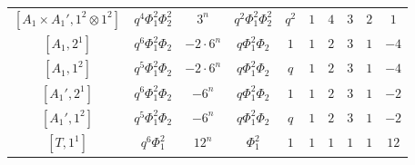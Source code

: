 \documentclass[12pt]{amsart}
\theoremstyle{plain}
\theoremstyle{definition}
\theoremstyle{remark}
\begin{document}
\begin{landscape}
\begin{figure}[h]
\begin{tabular}{|c|cc|ccccccc|}
$[{A_1\times A_1'},1^2\otimes1^2]$ & $q^4\Phi_1^2\Phi_2^2$ & $3^n$ & $q^2\Phi_1^2\Phi_2^2$ & $q^2$ & $1$ & $4$ & $3$ & $2$ & $1$ \\
$[{A_1},2^1]$ & $q^6\Phi_1^2\Phi_2$ & $-2\cdot 6^n$ & $q\Phi_1^2\Phi_2$ & $1$ & $1$ & $2$ & $3$ & $1$ & $-4$ \\
$[{A_1},1^2]$ & $q^5\Phi_1^2\Phi_2$ & $-2\cdot 6^n$ & $q\Phi_1^2\Phi_2$ & $q$ & $1$ & $2$ & $3$ & $1$ & $-4$ \\
$[{A_1'},2^1]$ & $q^6\Phi_1^2\Phi_2$ & $-6^n$ & $q\Phi_1^2\Phi_2$ & $1$ & $1$ & $2$ & $3$ & $1$ & $-2$ \\
$[{A_1'},1^2]$ & $q^5\Phi_1^2\Phi_2$ & $-6^n$ & $q\Phi_1^2\Phi_2$ & $q$ & $1$ & $2$ & $3$ & $1$ & $-2$ \\
$[T,1^1]$ & $q^6\Phi_1^2$ & $12^n$ & $\Phi_1^2$ & $1$ & $1$ & $1$ & $1$ & $1$ & $12$ \\
\hline
\end{tabular}
\end{figure}
\null\vfill
\end{landscape}
\end{document}

